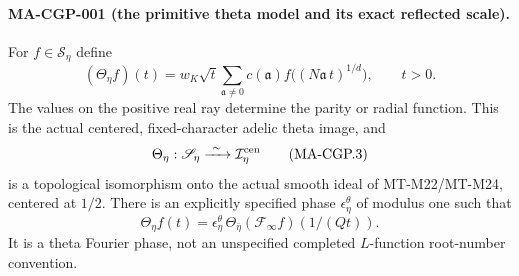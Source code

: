 \paragraph{MA-CGP-001 (the primitive theta model and its exact reflected scale).}
For $f\in\mathscr S_\eta$ define
\[
 (\Theta_\eta f)(t)
    =w_K\sqrt t\sum_{\mathfrak a\ne0}
            c(\mathfrak a)f\bigl((N\mathfrak a\,t)^{1/d}\bigr),
                   \qquad t>0.
 \tag{MA-CGP.2}
\]
The values on the positive real ray determine the parity or
radial function.  This is the actual centered, fixed-character
adelic theta image, and
\[
       \Theta_\eta:\mathscr S_\eta
          \xrightarrow{\ \sim\ }\mathcal I_\eta^{\rm cen}
 \tag{MA-CGP.3}
\]
is a topological isomorphism onto the actual smooth ideal
of MT-M22/MT-M24, centered at $1/2$.
There is an explicitly specified phase $\epsilon_\eta^\theta$
of modulus one such that
\[
 \Theta_\eta f(t)
      =\epsilon_\eta^\theta\,
           \Theta_{\bar\eta}(\mathcal F_\infty f)(1/(Qt)).
 \tag{MA-CGP.4}
\]
It is a theta Fourier phase, not an unspecified completed
$L$-function root-number convention.

